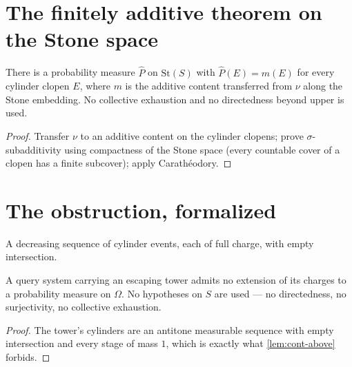 \section{The finitely additive theorem on the Stone space}

\begin{theorem}
\label{thm:stone-measure-exists}
\leanok
{}
There is a probability measure $\hat P$ on $\mathrm{St}(S)$ with
$\hat P(E) = m(E)$ for every cylinder clopen $E$, where $m$ is the additive
content transferred from $\nu$ along the Stone embedding. No collective
exhaustion and no directedness beyond upper is used.
\end{theorem}

\begin{proof}
\leanok
{}
Transfer $\nu$ to an additive content on the cylinder clopens; prove
$\sigma$-subadditivity using compactness of the Stone space (every countable
cover of a clopen has a finite subcover); apply Carath\'eodory.
\end{proof}

\section{The obstruction, formalized}

\begin{definition}
\label{def:escaping-tower}
\leanok
{}
  A decreasing sequence of cylinder events, each of full charge, with empty
intersection.
\end{definition}

\begin{theorem}
\label{thm:no-extension-tower}
\leanok
{}
A query system carrying an escaping tower admits no extension of its charges to
a probability measure on $\Omega$. No hypotheses on $S$ are used --- no
directedness, no surjectivity, no collective exhaustion.
\end{theorem}

\begin{proof}
\leanok
{}
The tower's cylinders are an antitone measurable sequence with empty
intersection and every stage of mass $1$, which is exactly what
\ref{lem:cont-above} forbids.
\end{proof}

